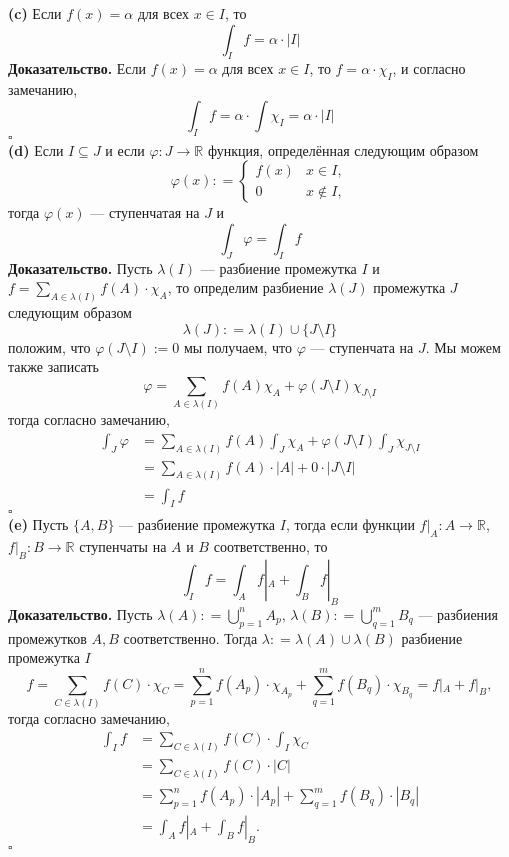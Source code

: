 \documentclass[a4paper]{article}
\newcommand{\qed}{\hfill$\square$}
\begin{document}
\indent\textbf{(c)} Если $f(x) = \alpha$ для всех $x \in I$, то
$$
\int_I f = \alpha \cdot |I|
$$
\indent\textbf{Доказательство.} Если $f(x) = \alpha$ для всех $x\in I$, то $f = \alpha \cdot \chi_I$, и согласно замечанию,
$$
\int_I f = \alpha\cdot \int \chi_I = \alpha \cdot |I|
$$\qed\\[4mm]
\indent\textbf{(d)} Если $I \subseteq J$ и если $\varphi: J \to \mathbb{R}$ функция, определённая следующим образом
$$
\varphi(x) : = \begin{cases}
f(x) & x \in I,\\
0 & x \notin I,
\end{cases}
$$
тогда $\varphi(x)$ — ступенчатая на $J$ и 
$$\int_J\varphi   = \int_I f$$
\indent\textbf{Доказательство.} Пусть $\lambda(I)$ — разбиение промежутка $I$ и $f = \displaystyle\sum_{A \in \lambda(I)} f(A) \cdot \chi_A$, то определим разбиение $\lambda(J)$ промежутка $J$ следующим образом
$$
\lambda(J): = \lambda(I) \cup \{J\setminus I\}
$$
положим, что $\varphi(J\setminus I) :=0$ мы получаем, что $\varphi$ — ступенчата на $J.$ Мы можем также записать
$$
\varphi = \sum_{A \in \lambda(I)} f(A) \chi_A + \varphi(J\setminus I) \chi_{J \setminus I}
$$
тогда согласно замечанию,
$$\begin{aligned}
\int_J \varphi &= \sum_{A \in \lambda(I)} f(A) \int_J \chi_A + \varphi(J\setminus I) \int_J \chi_{J \setminus I}   \\
&= \sum_{A \in \lambda(I)} f(A) \cdot |A| + 0 \cdot |J \setminus I|\\
&= \int_I f
\end{aligned}$$\qed\\[4mm]
\indent\textbf{(e)} Пусть $\{A,B\}$ — разбиение промежутка $I$, тогда если функции $f|_A:A \to \mathbb{R}$, $f|_B:B \to \mathbb{R}$ ступенчаты на $A$ и $B$ соответственно, то
$$
\int_I f  = \int_A f|_A  + \int_B f|_B
$$
\indent\textbf{Доказательство.} Пусть $\lambda(A): = \displaystyle\bigcup_{p=1}^n A_p$, $\lambda(B) : = \displaystyle\bigcup_{q=1}^m B_q$ — разбиения промежутков $A,B$ соответственно. Тогда $\lambda : = \lambda(A) \cup \lambda(B)$ разбиение промежутка $I$\\[2mm]
$$
f = \sum_{C \in \lambda(I)} f(C) \cdot \chi_C = \sum_{p=1}^n f(A_p)\cdot \chi_{A_p} + \sum_{q=1}^m f(B_q)\cdot \chi_{B_q} = f|_A + f|_B,
$$
тогда согласно замечанию,
$$\begin{aligned}
\int_I f &= \sum_{C \in \lambda(I)} f(C) \cdot \int_I \chi_C \\
&= \sum_{C \in \lambda(I)} f(C) \cdot |C| \\
&= \sum_{p=1}^n f(A_p) \cdot |A_p| + \sum_{q=1}^m f(B_q)\cdot |B_q| \\
&= \int_A f|_A + \int_B f|_B.
\end{aligned}$$\qed
\end{document}
